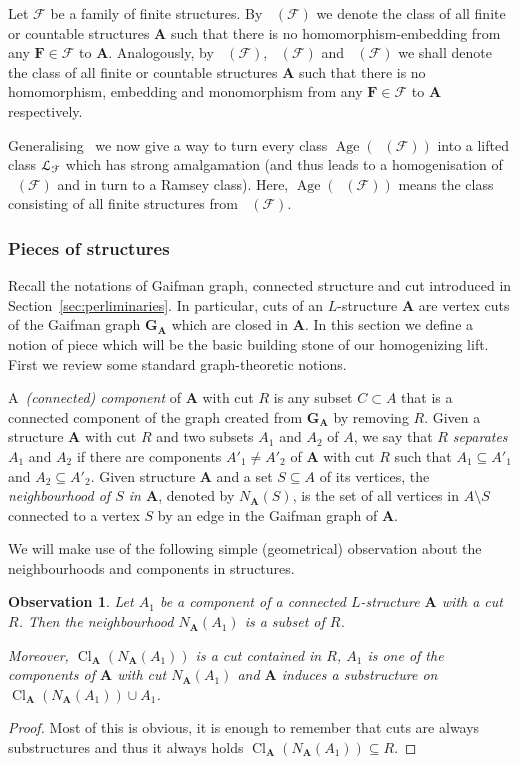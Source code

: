 \documentclass{elsarticle}
\def\Lifts{{\cal L}}
\def\Forb{\mathop{\mathrm{Forb_{he}}}\nolimits}
\def\Forbi{\mathop{\mathrm{Forb_e}}\nolimits}
\def\Forbm{\mathop{\mathrm{Forb_m}}\nolimits}
\def\Forbh{\mathop{\mathrm{Forb_h}}\nolimits}
\def\Age{\mathop{\mathrm{Age}}\nolimits}
\def\Cl{\mathop{\mathrm{Cl}}\nolimits}
\def\str#1{\mathbf {#1}}
\def\F{{\mathcal F}}
\theoremstyle{plain}
\newtheorem{observation}[theorem]{Observation}
\theoremstyle{definition}
\theoremstyle{remark}
\begin{document}
Let $\F$ be a family of finite structures.  By $\Forb(\F)$ we denote the class
of all finite or countable structures $\str{A}$ such that there is no
homomorphism-embedding from any $\str{F}\in \F$ to $\str{A}$.  Analogously, by
$\Forbh(\F)$, $\Forbi(\F)$ and $\Forbm(\F)$ we shall denote the class of all finite or countable structures
$\str{A}$ such that there is no homomorphism, embedding and monomorphism from any $\str{F}\in \F$ to
$\str{A}$ respectively.


Generalising~\cite{Hubicka2013, Hubicka2009} we now give a way to turn every class $\Age(\Forb(\F))$
 into a lifted class $\Lifts_\F$ which has strong
amalgamation (and thus leads to a homogenisation of~$\Forb(\F)$ and in turn to a Ramsey class).
Here, $\Age(\Forb(\F))$ means the class consisting of all finite structures from $\Forb(\F)$.

\subsubsection{Pieces of structures}
Recall the notations of Gaifman graph, connected structure and cut introduced in Section~\ref{sec:perliminaries}.
In particular, cuts of an $L$-structure $\str{A}$ are vertex cuts of the Gaifman graph $\str{G}_\str{A}$ which are closed in $\str{A}$.
In this section we define a notion of piece which will be the basic building stone of our homogenizing lift.
First we review some standard graph-theoretic notions.

A~\emph{(connected) component} of $\str{A}$ with cut $R$ is any subset $C\subset A$ that is
a connected component of the graph created from $\str{G}_\str{A}$ by removing $R$.
Given a structure $\str{A}$ with cut $R$ and two subsets
$A_1$ and $A_2$ of $A$, we say that $R$ \emph{separates}
$A_1$ and $A_2$ if there are components $A'_1\neq
A'_2$ of $\str{A}$ with cut $R$ such that $A_1\subseteq A'_1$ 
and $A_2\subseteq A'_2$.
Given structure $\str{A}$ and a set $S\subseteq A$ of its vertices, the
\emph{neighbourhood of $S$ in $\str{A}$}, denoted by $N_\str{A}(S)$, is
the set of all vertices in $A\setminus S$ connected to a vertex $S$ by an edge in the
Gaifman graph of $\str{A}$.

We will make use of the following simple (geometrical) observation about the neighbourhoods and
components in structures.

\begin{observation}
\label{cuty}
Let $A_1$ be a component of a connected $L$-structure $\str{A}$ with a cut $R$. Then the neighbourhood $N_\str{A}(A_1)$ is a subset of $R$.

Moreover, $\Cl_\str{A}(N_\str{A}(A_1))$ is a cut contained in $R$, $A_1$ is one of the components of $\str{A}$ with cut $N_\str{A}(A_1)$
and $\str{A}$ induces a substructure on $\Cl_\str{A}(N_\str{A}(A_1))\cup A_1$.
\end{observation}
\begin{proof}Most of this is obvious, it is enough to remember that cuts are always substructures and thus it always holds $\Cl_\str{A}(N_\str{A}(A_1))\subseteq R$.\end{proof}
\end{document}
